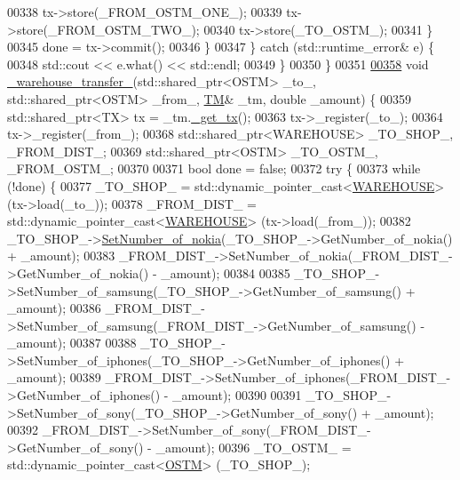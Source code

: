 \begin{DoxyCode}
00338                 tx->store(\_FROM\_OSTM\_ONE\_);
00339                 tx->store(\_FROM\_OSTM\_TWO\_);
00340                 tx->store(\_TO\_OSTM\_);
00341             \}
00345             done = tx->commit();
00346         \}
00347     \} \textcolor{keywordflow}{catch} (std::runtime\_error& e) \{
00348         std::cout << e.what() << std::endl;
00349     \}
00350 \}
00351 
\hypertarget{main_8cpp_source.tex_l00358}{}\hyperlink{main_8cpp_a1c170f18aac9dbb8aba1ad2f7e4619cc_a1c170f18aac9dbb8aba1ad2f7e4619cc}{00358} \textcolor{keywordtype}{void} \hyperlink{main_8cpp_a1c170f18aac9dbb8aba1ad2f7e4619cc_a1c170f18aac9dbb8aba1ad2f7e4619cc}{\_warehouse\_transfer\_}(std::shared\_ptr<OSTM> \_to\_, std::shared\_ptr<OSTM> \_from\_, 
      \hyperlink{class_t_m}{TM}& \_tm, \textcolor{keywordtype}{double} \_amount) \{
00359     std::shared\_ptr<TX> tx = \_tm.\hyperlink{class_t_m_a41cb0226cc4080c931651b13f74a0075_a41cb0226cc4080c931651b13f74a0075}{\_get\_tx}();
00363     tx->\_register(\_to\_);
00364     tx->\_register(\_from\_);
00368     std::shared\_ptr<WAREHOUSE> \_TO\_SHOP\_, \_FROM\_DIST\_;
00369     std::shared\_ptr<OSTM> \_TO\_OSTM\_, \_FROM\_OSTM\_;
00370 
00371     \textcolor{keywordtype}{bool} done = \textcolor{keyword}{false};
00372     \textcolor{keywordflow}{try} \{
00373         \textcolor{keywordflow}{while} (!done) \{
00377             \_TO\_SHOP\_ = std::dynamic\_pointer\_cast<\hyperlink{class_w_a_r_e_h_o_u_s_e}{WAREHOUSE}> (tx->load(\_to\_));
00378             \_FROM\_DIST\_ = std::dynamic\_pointer\_cast<\hyperlink{class_w_a_r_e_h_o_u_s_e}{WAREHOUSE}> (tx->load(\_from\_));
00382             \_TO\_SHOP\_->\hyperlink{class_w_a_r_e_h_o_u_s_e_a300d1fe21a47e45c0d5d27e25add346f_a300d1fe21a47e45c0d5d27e25add346f}{SetNumber\_of\_nokia}(\_TO\_SHOP\_->GetNumber\_of\_nokia() + \_amount);
00383             \_FROM\_DIST\_->SetNumber\_of\_nokia(\_FROM\_DIST\_->GetNumber\_of\_nokia() - \_amount);
00384 
00385             \_TO\_SHOP\_->SetNumber\_of\_samsung(\_TO\_SHOP\_->GetNumber\_of\_samsung() + \_amount);
00386             \_FROM\_DIST\_->SetNumber\_of\_samsung(\_FROM\_DIST\_->GetNumber\_of\_samsung() - \_amount);
00387 
00388             \_TO\_SHOP\_->SetNumber\_of\_iphones(\_TO\_SHOP\_->GetNumber\_of\_iphones() + \_amount);
00389             \_FROM\_DIST\_->SetNumber\_of\_iphones(\_FROM\_DIST\_->GetNumber\_of\_iphones() - \_amount);
00390 
00391             \_TO\_SHOP\_->SetNumber\_of\_sony(\_TO\_SHOP\_->GetNumber\_of\_sony() + \_amount);
00392             \_FROM\_DIST\_->SetNumber\_of\_sony(\_FROM\_DIST\_->GetNumber\_of\_sony() - \_amount);
00396             \_TO\_OSTM\_ = std::dynamic\_pointer\_cast<\hyperlink{class_o_s_t_m}{OSTM}> (\_TO\_SHOP\_);

\end{DoxyCode}
